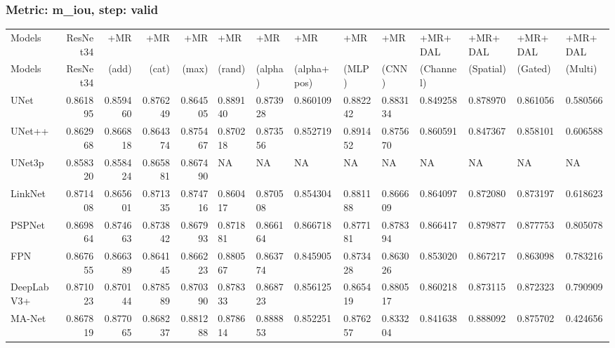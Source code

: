 \documentclass{article}
\begin{document}
\subsubsection{Metric: m\_iou, step: valid}
\begin{tabular}{lrrrrlllllllll}
\toprule
Models & ResNet34 & +MR  & +MR  & +MR  & +MR  & +MR  & +MR  & +MR  & +MR  & +MR+DAL & +MR+DAL & +MR+DAL & +MR+DAL \\
Models & ResNet34 &  (add) &  (cat) &  (max) &  (rand) &  (alpha) &  (alpha+pos) &  (MLP) &  (CNN) & (Channel) & (Spatial) & (Gated) & (Multi) \\
\midrule
UNet & 0.861895 & 0.859460 & 0.876249 & 0.864505 & 0.889140 & 0.873928 & 0.860109 & 0.882242 & 0.883134 & 0.849258 & 0.878970 & 0.861056 & 0.580566 \\
UNet++ & 0.862968 & 0.866818 & 0.864374 & 0.875467 & 0.870218 & 0.873556 & 0.852719 & 0.891452 & 0.875670 & 0.860591 & 0.847367 & 0.858101 & 0.606588 \\
UNet3p & 0.858320 & 0.858424 & 0.865881 & 0.867490 & NA & NA & NA & NA & NA & NA & NA & NA & NA \\
LinkNet & 0.871408 & 0.865601 & 0.871335 & 0.874716 & 0.860417 & 0.870508 & 0.854304 & 0.881188 & 0.866609 & 0.864097 & 0.872080 & 0.873197 & 0.618623 \\
PSPNet & 0.869864 & 0.874663 & 0.873842 & 0.867993 & 0.871881 & 0.866164 & 0.866718 & 0.877181 & 0.878394 & 0.866417 & 0.879877 & 0.877753 & 0.805078 \\
FPN & 0.867655 & 0.866389 & 0.864145 & 0.866223 & 0.880567 & 0.863774 & 0.845905 & 0.873428 & 0.863026 & 0.853020 & 0.867217 & 0.863098 & 0.783216 \\
DeepLabV3+ & 0.871023 & 0.870144 & 0.878589 & 0.870390 & 0.878333 & 0.868723 & 0.856125 & 0.865419 & 0.880517 & 0.860218 & 0.873115 & 0.872323 & 0.790909 \\
MA-Net & 0.867819 & 0.877065 & 0.868237 & 0.881288 & 0.878614 & 0.888853 & 0.852251 & 0.876257 & 0.833204 & 0.841638 & 0.888092 & 0.875702 & 0.424656 \\
\bottomrule
\end{tabular}
\end{document}
